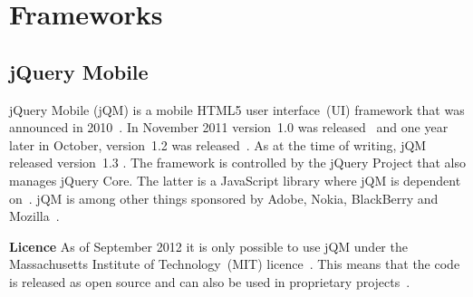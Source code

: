 \documentclass[a4paper]{artikel3}
\renewcommand{\paragraph}[1]{{\bf #1} }
\begin{document}


\section{Frameworks} %
\label{sec:frameworks}

\subsection{jQuery Mobile} %
\label{sec:jqm}

jQuery Mobile (jQM) is a mobile HTML5 user interface~(UI) framework that was announced in 2010~\cite{Resig2010}. 
In November 2011 version~1.0 was released~\cite{Parker2011} and one year later in October, version~1.2 was released~\cite{Parker2012}. 
As at the time of writing, jQM released version~1.3 \cite{Parker2013a}.
The framework is controlled by the jQuery Project that also manages jQuery Core. 
The latter is a JavaScript library where jQM is dependent on~\cite{JQuery2012}. 
jQM is among other things sponsored by Adobe, Nokia, BlackBerry and Mozilla~\cite{JQuery2012a}.

\paragraph{Licence}
As of September 2012 it is only possible to use jQM under the Massachusetts Institute of Technology~(MIT) licence~\cite{Dmethvin2012}. 
This means that the code is released as open source and can also be used in proprietary projects~\cite{PhilDutson2012}.
\end{document}
